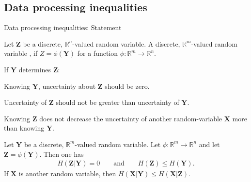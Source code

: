 \subsection{Data processing inequalities}
\begin{frame}{Data processing inequalities: Statement}
\begin{definition}
Let $\mathbf{Z}$ be a discrete, $\mathbb{R}^n$-valued random variable. A discrete, $\mathbb{R}^m$-valued random variable , if $Z=\phi(\mathbf{Y})$ for 
a function $\phi:\mathbb{R}^m\to\mathbb{R}^n$.
\end{definition}
\vspace{-2.5mm}

 If $\mathbf{Y}$ determines $\mathbf{Z}$:
\bit%
\item Knowing $\mathbf{Y}$, uncertainty about $\mathbf{Z}$ should be zero.
\item Uncertainty of $\mathbf{Z}$ should not be greater than uncertainty of $\mathbf{Y}$.
\item Knowing $\mathbf{Z}$ does not decrease the uncertainty of another random-variable $\mathbf{X}$ more than knowing $\mathbf{Y}$.
\eit 
{}
\begin{proposition}
Let $\mathbf{Y}$ be a discrete, $\mathbb{R}^m$-valued random variable. Let 
$\phi:\mathbb{R}^m\to\mathbb{R}^n$ and let $\mathbf{Z}=\phi(\mathbf{Y})$. 
Then one has 
\begin{align*}
H(\mathbf{Z}|\mathbf{Y})=0 \qquad\text{and} \qquad H(\mathbf{Z})\leq H(\mathbf{Y}).  
\end{align*}
If $\mathbf{X}$ is another random variable, then 
$H(\mathbf{X}|\mathbf{Y})\leq H(\mathbf{X}|\mathbf{Z})$. 
\end{proposition}
\end{frame}

